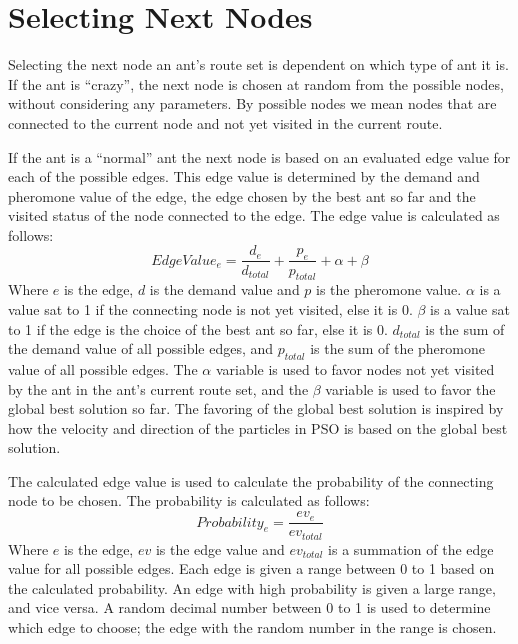 \section{Selecting Next Nodes}

Selecting the next node an ant's route set is dependent on which type of ant it is. If the ant is ``crazy'', the next node is chosen at random from the possible nodes, without considering any parameters. By possible nodes we mean nodes that are connected to the current node and not yet visited in the current route.

If the ant is a ``normal'' ant the next node is based on an evaluated edge value for each of the possible edges. This edge value is determined by the demand and pheromone value of the edge, the edge chosen by the best ant so far and the visited status of the node connected to the edge. The edge value is calculated as follows: 
\newline
$$EdgeValue_{e} = \frac{d_e}{d_{total}} + \frac{p_e}{p_{total}} + \alpha + \beta$$
\newline
Where $e$ is the edge, $d$ is the demand value and $p$ is the pheromone value. $\alpha$ is a value sat to 1 if the connecting node is not yet visited, else it is 0. $\beta$ is a value sat to 1 if the edge is the choice of the best ant so far, else it is 0. $d_{total}$ is the sum of the demand value of all possible edges, and $p_{total}$ is the sum of the pheromone value of all possible edges. The $\alpha$ variable is used to favor nodes not yet visited by the ant in the ant's current route set, and the $\beta$ variable is used to favor the global best solution so far. The favoring of the global best solution is inspired by how the velocity and direction of the particles in PSO is based on the global best solution. 

The calculated edge value is used to calculate the probability of the connecting node to be chosen. The probability is calculated as follows:
\newline
$$Probability_e = \frac{ev_e}{ev_{total}}$$
\newline
Where $e$ is the edge, $ev$ is the edge value and $ev_{total}$ is a summation of the edge value for all possible edges. 
Each edge is given a range between 0 to 1 based on the calculated probability. An edge with high probability is given a large range, and vice versa. A random decimal number between 0 to 1 is used to determine which edge to choose; the edge with the random number in the range is chosen. 



